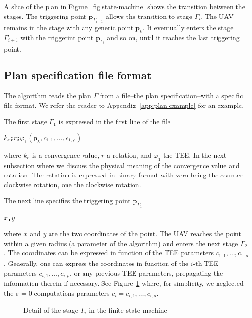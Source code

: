 \documentclass[letterpaper,10pt,conference]{ieeeconf}
\theoremstyle{definition}
\begin{document}
A slice of the plan in Figure~\ref{fig:state-machine} shows the transition between the stages. The triggering point $\mathbf{p}_{\Gamma_{i-1}}$ allows the transition to stage $\Gamma_i$. The UAV remains in the stage with any generic point $\mathbf{p}_k$. It eventually enters the stage $\Gamma_{i+1}$ with the triggerint point $\mathbf{p}_{\Gamma_i}$ and so on, until it reaches the last triggering point.

\subsection{Plan specification file format}
\label{sec:plan}

The algorithm reads the plan $\Gamma$ from a file--the plan specification--with a specific file format. We refer the reader to Appendix~\ref{app:plan-example} for an example.

The first stage $\Gamma_1$ is expressed in the first line of the file
\begin{algorithmic}[1]
  \State\textbf{\texttt{$k_e$;$r$;$\varphi_1(\mathbf{p}_k,c_{1,1},\dots,c_{1,\rho})$}}\label{code:stage}
\end{algorithmic}
where $k_e$ is a convergence value, $r$ a rotation, and $\varphi_1$ the TEE. In the next subsection where we discuss the physical meaning of the convergence value and rotation. The rotation is expressed in binary format with zero being the counter-clockwise rotation, one the clockwise rotation.

The next line specifies the triggering point $\mathbf{p}_{\Gamma_1}$
\begin{algorithmic}[1]
  \State\textbf{\texttt{$x$,$y$}}\label{code:trigger-pt}
\end{algorithmic}
where $x$ and $y$ are the two coordinates of the point. The UAV reaches the point within a given radius (a parameter of the algorithm) and enters the next stage $\Gamma_2$. The coordinates can be expressed in function of the TEE parameters $c_{1,1},\dots,c_{1,\rho}$. Generally, one can express the coordinates in function of the $i$-th TEE parameters $c_{i,1},\dots,c_{i,\rho}$, or any previous TEE parameters, propagating the information therein if necessary. See Figure~\ref{fig:state-machine2} where, for simplicity, we neglected the $\sigma=0$ computations parameters $c_i=c_{i,1},\dots,c_{i,\rho}$.

\begin{figure}[h]
  \center
  \caption{Detail of the stage $\Gamma_i$ in the finite state machine}
  \label{fig:state-machine2}
  \end{figure}
\end{document}
